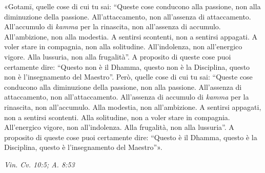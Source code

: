«Gotamī, quelle cose di cui tu sai: “Queste cose conducono alla
passione, non alla diminuzione della passione. All’attaccamento, non
all’assenza di attaccamento. All’accumulo di \emph{kamma} per la rinascita,
non all’assenza di accumulo. All’ambizione, non alla modestia. A
sentirsi scontenti, non a sentirsi appagati. A voler stare in compagnia,
non alla solitudine. All’indolenza, non all’energico vigore. Alla
lussuria, non alla frugalità”. A proposito di queste cose puoi
certamente dire: “Questo non è il Dhamma, questo non è la Disciplina,
questo non è l’insegnamento del Maestro”. Però, quelle cose di cui tu
sai: “Queste cose conducono alla diminuzione della passione, non alla
passione. All’assenza di attaccamento, non all’attaccamento. All’assenza
di accumulo di \emph{kamma} per la rinascita, non all’accumulo. Alla
modestia, non all’ambizione. A sentirsi appagati, non a sentirsi
scontenti. Alla solitudine, non a voler stare in compagnia. All’energico
vigore, non all’indolenza. Alla frugalità, non alla lussuria”. A
proposito di queste cose puoi certamente dire: “Questo è il Dhamma,
questo è la Disciplina, questo è l’insegnamento del Maestro”».


\emph{Vin. Cv. 10:5; A. 8:53}


